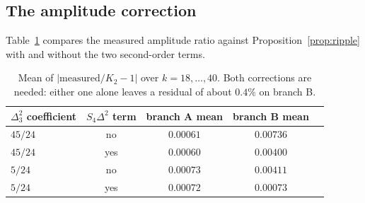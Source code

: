 \documentclass[11pt,a4paper]{article}
\theoremstyle{plain}
\theoremstyle{definition}
\theoremstyle{remark}
\begin{document}
\subsection{The amplitude correction}

Table~\ref{tab:k2} compares the measured amplitude ratio against
Proposition~\ref{prop:ripple} with and without the two second-order terms.

\begin{table}[htbp]
\centering
\begin{tabular}{lcccc}
\toprule
$\Delta_3^{2}$ coefficient & $S_4\Delta^{2}$ term & branch A mean & branch B mean\\
\midrule
$45/24$ & no  & $0.00061$ & $0.00736$\\
$45/24$ & yes & $0.00060$ & $0.00400$\\
$5/24$  & no  & $0.00073$ & $0.00411$\\
$5/24$  & yes & $0.00072$ & $\mathbf{0.00073}$\\
\bottomrule
\end{tabular}
\caption{Mean of $|\text{measured}/K_2-1|$ over $k=18,\dots,40$. Both
corrections are needed: either one alone leaves a residual of about $0.4\%$ on
branch B.}
\label{tab:k2}
\end{table}
\end{document}
